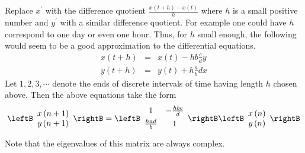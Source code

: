 Replace $x^{\prime }$ with the difference quotient $\frac{x\left( t+h\right)
-x\left( t\right) }{h}$ where $h$ is a small positive number and $y^{\prime
} $ with a similar difference quotient. For example one could have $h$
correspond to one day or even one hour. Thus, for $h$ small enough, the
following would seem to be a good approximation to the differential
equations.
\begin{eqnarray*}
x\left( t+h\right) &=&x\left( t\right) -hb\frac{c}{d}y \\
y\left( t+h\right) &=&y\left( t\right) +h\frac{a}{b}dx
\end{eqnarray*}
Let $1,2,3,\cdots $ denote the ends of discrete intervals of time having
length $h$ chosen above. Then the above equations take the form
\begin{equation*}
\leftB
\begin{array}{c}
x\left( n+1\right) \\
y\left( n+1\right)
\end{array}
\rightB =\leftB
\begin{array}{cc}
1 & -\vspace{0.05in}\frac{hbc}{d} \\
\vspace{0.05in}\frac{had}{b} & 1
\end{array}
\rightB \leftB
\begin{array}{c}
x\left( n\right) \\
y\left( n\right)
\end{array}
\rightB
\end{equation*}
Note that the eigenvalues of this matrix are always complex.

